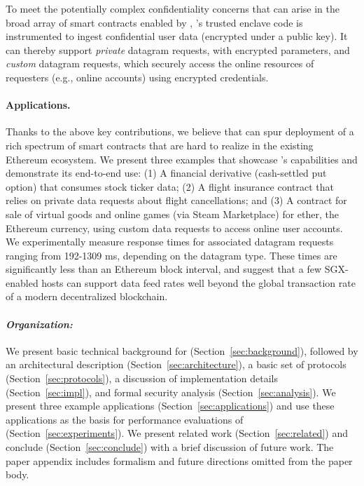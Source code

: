 \vspace{2mm}
 To meet the potentially complex confidentiality concerns that can arise in the broad array of smart contracts enabled by \tc, \tc's trusted enclave code is instrumented to ingest confidential user data (encrypted under a \tc public key). It can thereby support {\em private} datagram requests, with encrypted parameters, and {\em custom} datagram requests, which securely access the online resources of requesters (e.g., online accounts) using encrypted credentials. 

\paragraph{Applications.} Thanks to the above key contributions, we believe that \tc can spur deployment of a rich spectrum of smart contracts that are hard to realize in the existing Ethereum ecosystem. We present three examples that showcase \tc's capabilities and demonstrate its end-to-end use: (1) A financial derivative (cash-settled put option) that consumes stock ticker data; (2) A flight insurance contract that relies on private data requests about flight cancellations; and (3) A contract for sale of virtual goods and online games (via Steam Marketplace) for ether, the Ethereum currency, using custom data requests to access online user accounts. We experimentally measure response times for associated datagram requests ranging from 192-1309 ms, depending on the datagram type. These times are significantly less than an Ethereum block interval, and suggest that a few SGX-enabled hosts can support \tc data feed rates well beyond the global transaction rate of a modern decentralized blockchain.

\paragraph{\em Organization:} We present basic technical background for \tc (Section~\ref{sec:background}), followed by an architectural description (Section~\ref{sec:architecture}), a basic set of protocols (Section~\ref{sec:protocols}), a discussion of implementation details (Section~\ref{sec:impl}), and formal security analysis (Section~\ref{sec:analysis}). We present three example applications (Section~\ref{sec:applications}) and use these applications as the basis for performance evaluations of \tc (Section~\ref{sec:experiments}).  We present related work (Section~\ref{sec:related}) and conclude (Section~\ref{sec:conclude}) with a brief discussion of future work. The paper appendix includes formalism and future directions omitted from the paper body.




